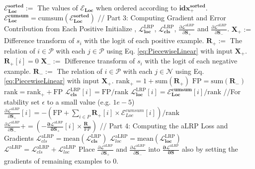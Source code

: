 \documentclass{article}
\begin{document}
\begin{algorithm}
\begin{algorithmic}[1]
\State $\mathbf{\mathcal{E}_{Loc}^{sorted}}:=$ The values of $\mathbf{\mathcal{E}_{Loc}}$ when ordered according to  $\mathbf{idx^{sorted}_+}$.
\State $\mathbf{\mathcal{E}_{Loc}^{cumsum}} =\mathrm{cumsum}(\mathbf{\mathcal{E}_{Loc}^{sorted}})$
\State // Part 3: Computing Gradient and Error Contribution from Each Positive
\State Initialize  , $\mathbf{\mathcal{L}^\mathrm{LRP}_{loc}}$, $\mathbf{\mathcal{L}^\mathrm{LRP}_{cls}}$, $\frac{\partial \mathcal{L}^\mathrm{aLRP}}{ \partial \mathbf{S_+}}$ and $\frac{\partial \mathcal{L}^\mathrm{aLRP}}{ \partial \mathbf{S_-}}$. 
\State $\mathbf{X_+}:=$ Difference transform of $s_i$ with the logit of each positive example.
\State $\mathbf{R_+}:=$ The relation of $i \in \mathcal{P}$ with each $j \in \mathcal{P}$ using Eq. \ref{eq:PiecewiseLinear} with input $\mathbf{X_+}$.
\State $\mathbf{R_+}[i] = 0$
\State $\mathbf{X_-}:=$ Difference transform of $s_i$ with the logit of each negative example.
\State $\mathbf{R_-}:=$  The relation of $i \in \mathcal{P}$ with each $j \in \mathcal{N}$ using Eq. \ref{eq:PiecewiseLinear} with input $\mathbf{X_+}$.
\State $\mathrm{rank}_+=1+\mathrm{sum}(\mathbf{R_+})$
\State $\mathrm{FP}=\mathrm{sum}(\mathbf{R_-})$
\State $\mathrm{rank}=\mathrm{rank}_+ +\mathrm{FP}$
\State $\mathbf{\mathcal{L}^\mathrm{LRP}_{cls}}[i] =  \mathrm{FP}/\mathrm{rank}$
\State $\mathbf{\mathcal{L}^\mathrm{LRP}_{loc}}[i] = \mathbf{\mathcal{E}_{Loc}^{cumsum}}[i]/\mathrm{rank}$
 //For stability set $\epsilon$ to a small value (e.g. $1e-5$)
\State $\frac{\partial \mathcal{L}^\mathrm{aLRP}}{ \partial \mathbf{S_+}}[i] = - \left( \mathrm{FP} + \sum \limits_{i \in P} \mathbf{R_+}[i] \times \mathcal{E}_{Loc}^{cumsum}[i] \right) /\mathrm{rank}$
\State $\frac{\partial \mathcal{L}^\mathrm{aLRP}}{ \partial \mathbf{S_-}} +=\left(- \mathbf{ \frac{\partial \mathcal{L}^\mathrm{aLRP}}{ \partial S_+}}[i] \times \frac{\mathbf{R_-}}{\mathrm{FP}} \right)$
\EndIf
\EndFor
\State // Part 4: Computing the aLRP Loss and Gradients
\State $\mathcal{L}^\mathrm{aLRP}_{cls} = \mathrm{mean}(\mathbf{\mathcal{L}^\mathrm{LRP}_{cls}})$
\State $\mathcal{L}^\mathrm{aLRP}_{loc} = \mathrm{mean}(\mathbf{\mathcal{L}^\mathrm{LRP}_{loc}})$
\State $\mathcal{L}^\mathrm{aLRP} =\mathcal{L}^\mathrm{aLRP}_{cls} + \mathcal{L}^\mathrm{aLRP}_{loc}$
\State Place $\frac{\partial \mathcal{L}^\mathrm{aLRP}}{ \partial \mathbf{S_+}}$ and $\frac{\partial \mathcal{L}^\mathrm{aLRP}}{ \partial \mathbf{S_-}}$ into $\mathbf{\frac{\partial \mathcal{L}^\mathrm{aLRP}}{ \partial S}}$ also by setting the gradients of remaining examples to $0$.

\end{algorithmic}
\end{algorithm}
\end{document}
